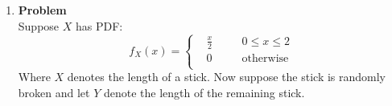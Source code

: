 \documentclass[12pt]{article}
\newenvironment{Ex}{\textbf{Problem}\vspace{.75em}\\}{}
\begin{document}
\begin{enumerate}
\begin{Ex}
\begin{solution}
\begin{enumerate}
\begin{equation}
\begin{aligned}
            &= \frac{5}{3} \frac{1}{3} \\
            \implies P\left(Y \le \frac{1}{3}\right) &= \frac{5}{9} \\
          \end{aligned}
        \end{equation}
        So now we can obtain the conditional joint density
        \begin{equation}
          \label{eq:2a-conditional-joint-density-plugged}
          \begin{aligned}
            f_{X,Y|A}(x,y) &= \frac{f_{X,Y}(x,y)}{P(Y \le 1/3)} \\
            &= \frac{\frac{5x^2}{2}}{\frac{5}{9}} \\
            \implies f_{X,Y|A}(x,y) &= \frac{9x^2}{2} \\
          \end{aligned}
        \end{equation}
        Or, more precisely
        \begin{equation}
          \label{eq:2a-sol}
          \implies f_{X,Y|A}(x,y) = \left\{
            \begin{aligned}
              & \frac{9x^2}{2} &&\quad (x,y) \in A \\
              & 0 && \text{otherwise} \\
            \end{aligned}\right.
        \end{equation}
      \item{\color{red}{\huge TODO}}
      \item{\color{red}{\huge TODO}}
      \end{enumerate}
    \end{solution}
  \end{Ex}
\item
  \begin{Ex}
    Suppose $X$ has PDF:
    \begin{equation}
      \label{eq:3-question}
      f_X(x) = \left\{
        \begin{aligned}
          &\frac{x}{2} &&\quad 0\le x\le 2 \\
          &0 &&\quad \text{otherwise} \\
        \end{aligned}\right.
    \end{equation}
    Where $X$ denotes the length of a stick. Now suppose the stick is
    randomly broken and let $Y$ denote the length of the remaining
    stick.

\end{Ex}
\end{enumerate}
\end{document}
